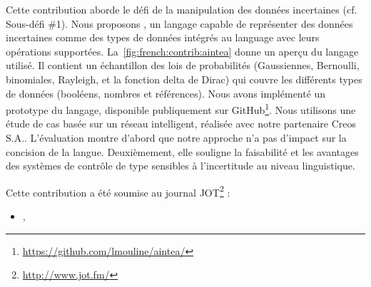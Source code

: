 %
Cette contribution aborde le défi de la manipulation des données incertaines (cf. Sous-défi \#1). 
Nous proposons \langName{}, un langage capable de représenter des données incertaines comme des types de données intégrés au language avec leurs opérations supportées. 
La~\cref{fig:french:contrib:aintea} donne un aperçu du langage utilisé. 
Il contient un échantillon des lois de probabilités (Gaussiennes, Bernoulli, binomiales, Rayleigh, et la fonction delta de Dirac) qui couvre les différents types de données (booléens, nombres et références). 
Nous avons implémenté un prototype du langage, disponible publiquement sur GitHub\footnote{\url{https://github.com/lmouline/aintea/}}. 
Nous utilisons une étude de cas basée sur un réseau intelligent, réalisée avec notre partenaire Creos S.A.. 
L'évaluation montre d'abord que notre approche n'a pas d'impact sur la concision de la langue. 
Deuxièmement, elle souligne la faisabilité et les avantages des systèmes de contrôle de type sensibles à l'incertitude au niveau linguistique.

%
Cette contribution a été soumise au journal JOT\footnote{\url{http://www.jot.fm/}} :
\begin{itemize}
	\item {}, \citeauthor{insubmission:2019:comlan:datauncertainty}
\end{itemize}


